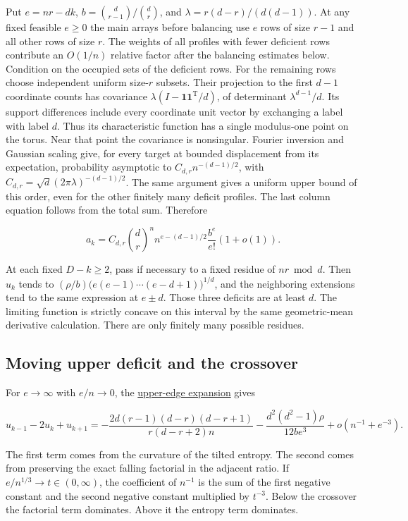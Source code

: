 \documentclass[11pt]{article}
\begin{document}
Put $e=nr-dk$, $b=\binom d{r-1}/\binom dr$, and
$\lambda=r(d-r)/(d(d-1))$. At any fixed feasible $e\ge0$ the main arrays before balancing use $e$ rows of size $r-1$ and all other rows of size $r$. The weights of all profiles with fewer deficient rows contribute an $O(1/n)$ relative factor after the balancing estimates below. Condition on the occupied sets of the deficient rows. For the remaining rows choose independent uniform size-$r$ subsets. Their projection to the first $d-1$ coordinate counts has covariance $\lambda(I-\mathbf1\mathbf1^{\mathrm T}/d)$, of determinant $\lambda^{d-1}/d$. Its support differences include every coordinate unit vector by exchanging a label with label $d$. Thus its characteristic function has a single modulus-one point on the torus. Near that point the covariance is nonsingular. Fourier inversion and Gaussian scaling give, for every target at bounded displacement from its expectation, probability asymptotic to $C_{d,r}n^{-(d-1)/2}$, with $C_{d,r}=\sqrt d(2\pi\lambda)^{-(d-1)/2}$. The same argument gives a uniform upper bound of this order, even for the other finitely many deficit profiles. The last column equation follows from the total sum. Therefore

\begin{equation*}
a_k=C_{d,r}\binom{d}{r}^{n} n^{e-(d-1)/2}\frac{b^e}{e!}(1+o(1)).
\end{equation*}

At each fixed $D-k\ge2$, pass if necessary to a fixed residue of $nr\bmod d$. Then $u_k$ tends to
$(\rho/b)\bigl(e(e-1)\cdots(e-d+1)\bigr)^{1/d}$, and the neighboring extensions tend to the same expression at $e\pm d$. Those three deficits are at least $d$. The limiting function is strictly concave on this interval by the same geometric-mean derivative calculation. There are only finitely many possible residues.

\subsection{Moving upper deficit and the crossover}

For $e\to\infty$ with $e/n\to0$, the \hyperref[sec:upper]{upper-edge expansion} gives

\begin{equation*}
u_{k-1}-2u_k+u_{k+1}=
-\frac{2d(r-1)(d-r)(d-r+1)}{r(d-r+2)n}
-\frac{d^2(d^2-1)\rho}{12b e^3}
+o(n^{-1}+e^{-3}).
\end{equation*}

The first term comes from the curvature of the tilted entropy. The second comes from preserving the exact falling factorial in the adjacent ratio. If $e/n^{1/3}\to t\in(0,\infty)$, the coefficient of $n^{-1}$ is the sum of the first negative constant and the second negative constant multiplied by $t^{-3}$. Below the crossover the factorial term dominates. Above it the entropy term dominates.
\end{document}
